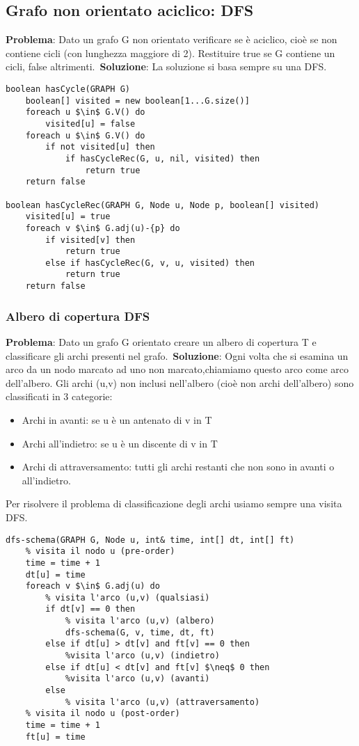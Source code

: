 \documentclass[../cheatSheetAlgoritmi.tex]{subfiles}
\begin{document}
\subsection{Grafo non orientato aciclico: DFS}
\textbf{Problema}: Dato un grafo G non orientato verificare se è aciclico, cioè se non contiene cicli (con lunghezza maggiore di 2). Restituire true se G contiene un cicli, false altrimenti.\
\textbf{Soluzione}: La soluzione si basa sempre su una DFS. \
\begin{lstlisting}[caption= Grafo non orientato aciclico (hasCycle)]
boolean hasCycle(GRAPH G)
	boolean[] visited = new boolean[1...G.size()]
	foreach u $\in$ G.V() do
		visited[u] = false
	foreach u $\in$ G.V() do
		if not visited[u] then
			if hasCycleRec(G, u, nil, visited) then
				return true
	return false

boolean hasCycleRec(GRAPH G, Node u, Node p, boolean[] visited)
	visited[u] = true
	foreach v $\in$ G.adj(u)-{p} do
		if visited[v] then
			return true
		else if hasCycleRec(G, v, u, visited) then
			return true
	return false
\end{lstlisting}

\newpage
\subsubsection{Albero di copertura DFS}
\textbf{Problema}: Dato un grafo G orientato creare un albero di copertura T e classificare gli archi presenti nel grafo.\
\textbf{Soluzione}: Ogni volta che si esamina un arco da un nodo marcato ad uno non marcato,chiamiamo questo arco come arco dell'albero. Gli archi (u,v) non inclusi nell'albero (cioè non archi dell'albero) sono classificati in 3 categorie: 

\begin{itemize}
 	\item Archi in avanti: se u è un antenato di v in T
 	\item Archi all'indietro: se u è un discente di v in T
 	\item Archi di attraversamento: tutti gli archi restanti che non sono in avanti o all'indietro.
\end{itemize}
Per risolvere il problema di classificazione degli archi usiamo sempre una visita DFS.

\begin{lstlisting}[caption= Albero di copertura]
% time: contatore, dt: discovery time (tempo di scoperta del nodo), ft: finish time (tempo di fine visita del nodo e dei suoi archi)
dfs-schema(GRAPH G, Node u, int& time, int[] dt, int[] ft)
	% visita il nodo u (pre-order)
	time = time + 1
	dt[u] = time
	foreach v $\in$ G.adj(u) do
		% visita l'arco (u,v) (qualsiasi)
		if dt[v] == 0 then
			% visita l'arco (u,v) (albero)
			dfs-schema(G, v, time, dt, ft)
		else if dt[u] > dt[v] and ft[v] == 0 then
			%visita l'arco (u,v) (indietro)
		else if dt[u] < dt[v] and ft[v] $\neq$ 0 then
			%visita l'arco (u,v) (avanti)
		else
			% visita l'arco (u,v) (attraversamento) 
	% visita il nodo u (post-order)
	time = time + 1
	ft[u] = time
\end{lstlisting}
\end{document}
